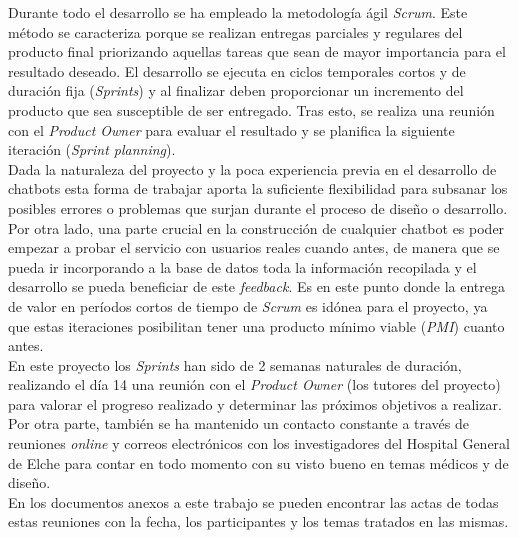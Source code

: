 Durante todo el desarrollo se ha empleado la metodología ágil \textit{Scrum}. Este método se caracteriza porque se realizan entregas parciales y regulares del producto final priorizando aquellas tareas que sean de mayor importancia para el resultado deseado. El desarrollo se ejecuta en ciclos temporales cortos y de duración fija (\textit{Sprints}) y al finalizar deben proporcionar un incremento del producto que sea susceptible de ser entregado. Tras esto, se realiza una reunión con el \textit{Product Owner} para evaluar el resultado y se planifica la siguiente iteración (\textit{Sprint planning}).\\

Dada la naturaleza del proyecto y la poca experiencia previa en el desarrollo de chatbots esta forma de trabajar aporta la suficiente flexibilidad para subsanar los posibles errores o problemas que surjan durante el proceso de diseño o desarrollo. Por otra lado, una parte crucial en la construcción de cualquier chatbot es poder empezar a probar el servicio con usuarios reales cuando antes, de manera que se pueda ir incorporando a la base de datos toda la información recopilada y el desarrollo se pueda beneficiar de este \textit{feedback}. Es en este punto donde la entrega de valor en períodos cortos de tiempo de \textit{Scrum} es idónea para el proyecto, ya que estas iteraciones posibilitan tener una producto mínimo viable (\textit{PMI}) cuanto antes.\\

En este proyecto los \textit{Sprints} han sido de 2 semanas naturales de duración, realizando el día 14 una reunión con el \textit{Product Owner} (los tutores del proyecto) para valorar el progreso realizado y determinar las próximos objetivos a realizar. \\

Por otra parte, también se ha mantenido un contacto constante a través de reuniones \textit{online} y correos electrónicos con los investigadores del Hospital General de Elche para contar en todo momento con su visto bueno en temas médicos y de diseño.\\

En los documentos anexos a este trabajo se pueden encontrar las actas de todas estas reuniones con la fecha, los participantes y los temas tratados en las mismas.\\




